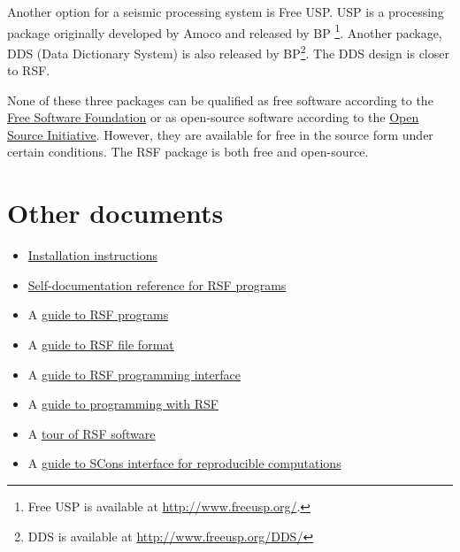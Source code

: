 Another option for a seismic processing system is Free USP. USP is a
processing package originally developed by Amoco and released by BP
\footnote{Free USP is available at
\url{http://www.freeusp.org/}.}. Another package, DDS (Data Dictionary
System) is also released by BP\footnote{DDS is available at
\url{http://www.freeusp.org/DDS/}}. The DDS design is closer to RSF.

None of these three packages can be qualified as free software according to
the \href{http://www.fsf.org/philosophy/free-sw.html}{Free Software
  Foundation} or as open-source software according to the
\href{http://www.opensource.org/docs/definition.php}{Open Source Initiative}.
However, they are available for free in the source form under certain
conditions. The RSF package is both free and open-source.

\section{Other documents}

\begin{itemize}
\item
  \href{http://egl.beg.utexas.edu/RSF/book/rsf/rsf/install_html/}{Installation instructions}
\item \href{http://egl.beg.utexas.edu/RSF/}{Self-documentation reference for RSF programs}
\item A \href{http://egl.beg.utexas.edu/RSF/book/rsf/rsf/prog_html/}{guide to RSF programs}
\item A \href{http://egl.beg.utexas.edu/RSF/book/rsf/rsf/format_html/}
  {guide to RSF file format}
\item A \href{http://egl.beg.utexas.edu/RSF/book/rsf/rsf/api_html/}{guide to
    RSF programming interface}
\item A \href{http://egl.beg.utexas.edu/RSF/book/rsf/rsf/demo_html/}{guide to programming with RSF}
\item A \href{http://egl.beg.utexas.edu/RSF/book/rsf/rsf/tour_html/}{tour of RSF software}
\item A
  \href{http://egl.beg.utexas.edu/RSF/book/rsf/scons/paper_html/}{guide
    to SCons interface for reproducible computations}
\end{itemize}




%


